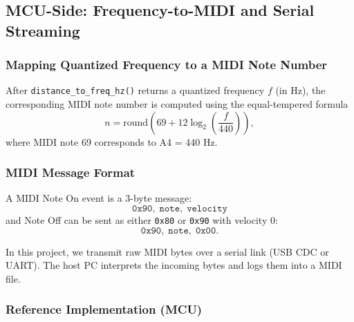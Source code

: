 \documentclass[12pt]{article}
\begin{document}
\subsection{MCU-Side: Frequency-to-MIDI and Serial Streaming}
\label{subsec:mcu_midi}

\subsubsection{Mapping Quantized Frequency to a MIDI Note Number}

After \texttt{distance\_to\_freq\_hz()} returns a quantized frequency $f$ (in Hz), the corresponding MIDI note number is computed using the equal-tempered formula
\[
n = \mathrm{round}\!\left(69 + 12 \log_2\!\left(\frac{f}{440}\right)\right),
\]
where MIDI note 69 corresponds to A4 = 440 Hz.

\subsubsection{MIDI Message Format}

A MIDI Note On event is a 3-byte message:
\[
\texttt{0x90},\; \texttt{note},\; \texttt{velocity}
\]
and Note Off can be sent as either \texttt{0x80} or \texttt{0x90} with velocity 0:
\[
\texttt{0x90},\; \texttt{note},\; \texttt{0x00}.
\]

In this project, we transmit raw MIDI bytes over a serial link (USB CDC or UART). The host PC interprets the incoming bytes and logs them into a MIDI file.

\subsubsection{Reference Implementation (MCU)}
\end{document}
